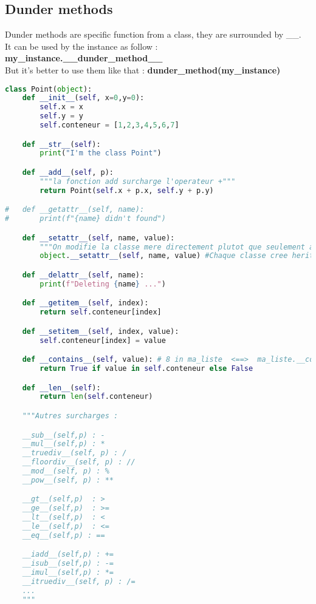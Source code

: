 \documentclass[a4paper, 12pt, titlepage]{scrartcl} %
\begin{document}
\subsection{Dunder methods}
Dunder methods are specific function from a class, they are surrounded by \_\_. \\
It can be used by the instance as follow : \textbf{my\_instance.\_\_dunder\_method\_\_} \\
But it's better to use them like that : \textbf{dunder\_method(my\_instance)}
\begin{lstlisting}[language=Python]
class Point(object):
	def __init__(self, x=0,y=0):
		self.x = x
		self.y = y
		self.conteneur = [1,2,3,4,5,6,7]

	def __str__(self):
		print("I'm the class Point")

	def __add__(self, p):
		"""la fonction add surcharge l'operateur +"""
		return Point(self.x + p.x, self.y + p.y)

#	def __getattr__(self, name):
#		print(f"{name} didn't found")

	def __setattr__(self, name, value):
		"""On modifie la classe mere directement plutot que seulement appeler setaatr de cette classe et tourner en boucle sur la meme methode"""
		object.__setattr__(self, name, value) #Chaque classe cree herite de base de la classe object

	def __delattr__(self, name):
		print(f"Deleting {name} ...")

	def __getitem__(self, index):
		return self.conteneur[index]

	def __setitem__(self, index, value):
		self.conteneur[index] = value

	def __contains__(self, value): # 8 in ma_liste  <==>  ma_liste.__contains__(8)
		return True if value in self.conteneur else False

	def __len__(self):
		return len(self.conteneur)

	"""Autres surcharges : 

	__sub__(self,p) : -
	__mul__(self,p) : *
	__truediv__(self, p) : /
	__floordiv__(self, p) : //
	__mod__(self, p) : %
	__pow__(self, p) : **

	__gt__(self,p)  : >
	__ge__(self,p) 	: >=
	__lt__(self,p)  : <
	__le__(self,p)  : <=
	__eq__(self,p) : == 

	__iadd__(self,p) : +=
	__isub__(self,p) : -=
	__imul__(self,p) : *=
	__itruediv__(self, p) : /=	
	...
	"""
\end{lstlisting} \vspace{5mm}
\end{document}
